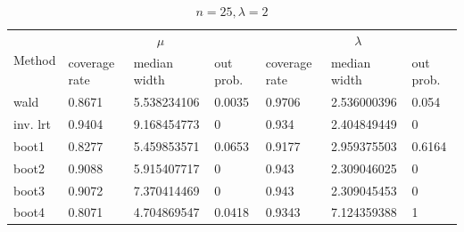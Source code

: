 \documentclass{article}
\begin{document}
\begin{table}[!htb]
        \begin{subtable}[b]{\textwidth}
		\centering
		\begin{tabular}{l|lll|lll}
		\toprule
        \multirow{2}{*}{Method} & \multicolumn{3}{c|}{$\mu$}      & \multicolumn{3}{c}{$\lambda$}  \\ 
                           & coverage rate & median width & out prob. & coverage rate & median width & out prob. \\
                           \midrule
wald      &0.8671	&5.538234106&	0.0035 &0.9706	&2.536000396	&0.054 \\
inv. lrt  &0.9404	&9.168454773&	0      &0.934	&2.404849449	&0     \\
boot1     &0.8277	&5.459853571&	0.0653 &0.9177	&2.959375503	&0.6164\\
boot2     &0.9088	&5.915407717&	0      &0.943	&2.309046025	&0     \\
boot3     &0.9072	&7.370414469&	0      &0.943	&2.309045453	&0     \\
boot4     &0.8071	&4.704869547&	0.0418 &0.9343	&7.124359388	&1     \\
       \bottomrule
       \end{tabular}
       \caption{$n = 25, \lambda = 2$}
       \label{25_2}
       \end{subtable}%
       \end{table}
\end{document}
